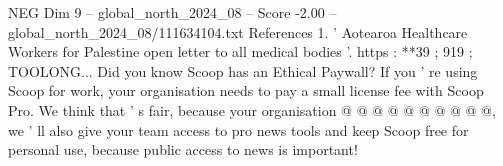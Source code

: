 \begin{textsample}{NEG Dim 9 – global\_north\_2024\_08 – Score -2.00 – global\_north\_2024\_08/111634104.txt}
References 1. ' Aotearoa Healthcare Workers for Palestine open letter to all medical bodies '. https : **39 ; 919 ; TOOLONG...
Did you know Scoop has an Ethical Paywall?
If you ' re using Scoop for work, your organisation needs to pay a small license fee with Scoop Pro.
We think that ' s fair, because your organisation @ @ @ @ @ @ @ @ @ @, we ' ll also give your team access to pro news tools and keep Scoop free for personal use, because public access to news is important!

\end{textsample}
